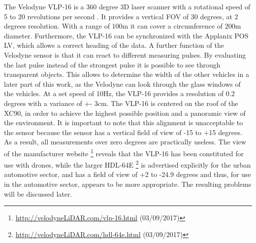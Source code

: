 The Velodyne VLP-16 is a 360 degree 3D laser scanner with a rotational speed of 5 to 20 revolutions per second \cite{manVEL}.
It provides a vertical FOV of 30 degrees, at 2 degrees resolution.
With a range of 100m it can cover a circumference of 200m diameter. 
Furthermore, the VLP-16 can be synchronized with the Applanix POS LV, which allows a correct heading of the data. 
A further function of the Velodyne sensor is that it can react to different measuring pulses. 
By evaluating the last pulse instead of the strongest pulse it is possible to see through transparent objects. 
This allows to determine the width of the other vehicles in a later part of this work, as the Velodyne can look through the glass windows of the vehicles. 
At a set speed of 10Hz, the VLP-16 provides a resolution of 0.2 degrees with a variance of +- 3cm. 
The VLP-16 is centered on the roof of the XC90, in order to achieve the highest possible position and a panoramic view of the environment.
It is important to note that this alignment is unacceptable to the sensor because the sensor has a vertical field of view of -15 to +15 degrees.
As a result, all measurements over zero degrees are practically useless. The view of the manufacturer website
\footnote{\url{http://velodyneLiDAR.com/vlp-16.html} (03/09/2017)}
reveals that the VLP-16 has been constituted for use with drones, while the larger HDL-64E
\footnote{\url{http://velodyneLiDAR.com/hdl-64e.html} (03/09/2017)}
is advertised explicitly for the urban automotive sector, and has a field of view of +2 to -24.9 degrees and thus, for use in the
automotive sector, appears to be more appropriate. The resulting problems will be discussed later.


